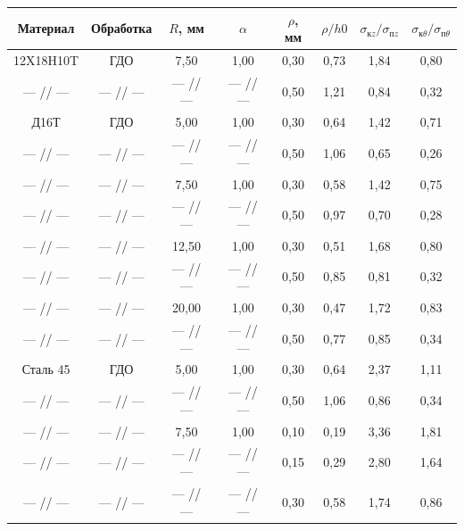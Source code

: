 \begin{table}[b!] \small \centering
\setlength{\tabcolsep}{2pt}
\begin{tabular}{c|c|c|c|c|c|c|c}
\hline
\footnotesize Материал & 
\footnotesize Обработка & 
\footnotesize $R$,  мм & 
\footnotesize $\alpha$ &  
\footnotesize $\rho$, мм & 
\footnotesize $\rho/h0$ & 
\footnotesize $\sigma_{\text{к} z}/ \sigma_{\text{п} z}$ & 
\footnotesize $\sigma_{\text{к} \theta}/ \sigma_{\text{п} \theta}$ \\ \hline
\rule{0mm}{12pt}%
12X18H10T&ГДО&7,50&1,00&0,30&0,73&1,84&0,80 \\
\footnotesize --- // --- &
\footnotesize --- // --- &
\footnotesize --- // --- &
\footnotesize --- // --- &0,50&1,21&0,84&0,32 \\
Д16Т&ГДО&5,00&1,00&0,30&0,64&1,42&0,71 \\
\footnotesize --- // --- &
\footnotesize --- // --- &
\footnotesize --- // --- &
\footnotesize --- // --- &0,50&1,06&0,65&0,26 \\
\footnotesize --- // --- &
\footnotesize --- // --- &7,50&1,00&0,30&0,58&1,42&0,75 \\
\footnotesize --- // --- &
\footnotesize --- // --- &
\footnotesize --- // --- &
\footnotesize --- // --- &0,50&0,97&0,70&0,28 \\
\footnotesize --- // --- &
\footnotesize --- // --- &12,50&1,00&0,30&0,51&1,68&0,80 \\
\footnotesize --- // --- &
\footnotesize --- // --- &
\footnotesize --- // --- &
\footnotesize --- // --- &0,50&0,85&0,81&0,32 \\
\footnotesize --- // --- &
\footnotesize --- // --- &20,00&1,00&0,30&0,47&1,72&0,83 \\
\footnotesize --- // --- &
\footnotesize --- // --- &
\footnotesize --- // --- &
\footnotesize --- // --- &0,50&0,77&0,85&0,34 \\
 Сталь  45 &ГДО&5,00&1,00&0,30&0,64&2,37&1,11 \\
\footnotesize --- // --- &
\footnotesize --- // --- &
\footnotesize --- // --- &
\footnotesize --- // --- &0,50&1,06&0,86&0,34 \\
\footnotesize --- // --- &
\footnotesize --- // --- &7,50&1,00&0,10&0,19&3,36&1,81 \\
\footnotesize --- // --- &
\footnotesize --- // --- &
\footnotesize --- // --- &
\footnotesize --- // --- &0,15&0,29&2,80&1,64 \\
\footnotesize --- // --- &
\footnotesize --- // --- &
\footnotesize --- // --- &
\footnotesize --- // --- &0,30&0,58&1,74&0,86 \\

\end{tabular}
\end{table}
